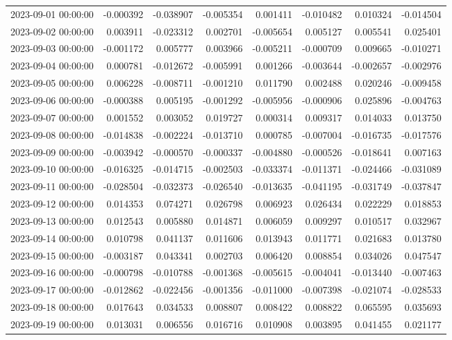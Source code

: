 \begin{tabular}{lrrrrrrr}
2023-09-01 00:00:00 & -0.000392 & -0.038907 & -0.005354 & 0.001411 & -0.010482 & 0.010324 & -0.014504 \\
2023-09-02 00:00:00 & 0.003911 & -0.023312 & 0.002701 & -0.005654 & 0.005127 & 0.005541 & 0.025401 \\
2023-09-03 00:00:00 & -0.001172 & 0.005777 & 0.003966 & -0.005211 & -0.000709 & 0.009665 & -0.010271 \\
2023-09-04 00:00:00 & 0.000781 & -0.012672 & -0.005991 & 0.001266 & -0.003644 & -0.002657 & -0.002976 \\
2023-09-05 00:00:00 & 0.006228 & -0.008711 & -0.001210 & 0.011790 & 0.002488 & 0.020246 & -0.009458 \\
2023-09-06 00:00:00 & -0.000388 & 0.005195 & -0.001292 & -0.005956 & -0.000906 & 0.025896 & -0.004763 \\
2023-09-07 00:00:00 & 0.001552 & 0.003052 & 0.019727 & 0.000314 & 0.009317 & 0.014033 & 0.013750 \\
2023-09-08 00:00:00 & -0.014838 & -0.002224 & -0.013710 & 0.000785 & -0.007004 & -0.016735 & -0.017576 \\
2023-09-09 00:00:00 & -0.003942 & -0.000570 & -0.000337 & -0.004880 & -0.000526 & -0.018641 & 0.007163 \\
2023-09-10 00:00:00 & -0.016325 & -0.014715 & -0.002503 & -0.033374 & -0.011371 & -0.024466 & -0.031089 \\
2023-09-11 00:00:00 & -0.028504 & -0.032373 & -0.026540 & -0.013635 & -0.041195 & -0.031749 & -0.037847 \\
2023-09-12 00:00:00 & 0.014353 & 0.074271 & 0.026798 & 0.006923 & 0.026434 & 0.022229 & 0.018853 \\
2023-09-13 00:00:00 & 0.012543 & 0.005880 & 0.014871 & 0.006059 & 0.009297 & 0.010517 & 0.032967 \\
2023-09-14 00:00:00 & 0.010798 & 0.041137 & 0.011606 & 0.013943 & 0.011771 & 0.021683 & 0.013780 \\
2023-09-15 00:00:00 & -0.003187 & 0.043341 & 0.002703 & 0.006420 & 0.008854 & 0.034026 & 0.047547 \\
2023-09-16 00:00:00 & -0.000798 & -0.010788 & -0.001368 & -0.005615 & -0.004041 & -0.013440 & -0.007463 \\
2023-09-17 00:00:00 & -0.012862 & -0.022456 & -0.001356 & -0.011000 & -0.007398 & -0.021074 & -0.028533 \\
2023-09-18 00:00:00 & 0.017643 & 0.034533 & 0.008807 & 0.008422 & 0.008822 & 0.065595 & 0.035693 \\
2023-09-19 00:00:00 & 0.013031 & 0.006556 & 0.016716 & 0.010908 & 0.003895 & 0.041455 & 0.021177 \\

\end{tabular}
